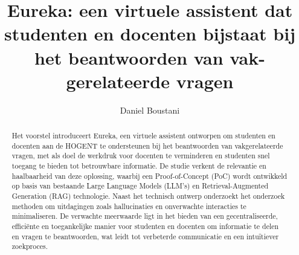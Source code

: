 \documentclass{hogent-article}
\title{Eureka: een virtuele assistent dat studenten en docenten bijstaat bij het beantwoorden van vak-gerelateerde vragen}
\author{Daniel Boustani}
\begin{document}
\begin{abstract}
  Het voorstel introduceert Eureka, een virtuele assistent ontworpen om studenten en docenten aan de HOGENT te ondersteunen bij het beantwoorden van vakgerelateerde vragen, met als doel de werkdruk voor docenten te verminderen en studenten snel toegang te bieden tot betrouwbare informatie. De studie verkent de relevantie en haalbaarheid van deze oplossing, waarbij een Proof-of-Concept (PoC) wordt ontwikkeld op basis van bestaande Large Language Models (LLM's) en Retrieval-Augmented Generation (RAG) technologie. Naast het technisch ontwerp onderzoekt het onderzoek methoden om uitdagingen zoals hallucinaties en onverwachte interacties te minimaliseren. De verwachte meerwaarde ligt in het bieden van een gecentraliseerde, efficiënte en toegankelijke manier voor studenten en docenten om informatie te delen en vragen te beantwoorden, wat leidt tot verbeterde communicatie en een intuïtiever zoekproces.
\end{abstract}

\tableofcontents



\printbibliography[heading=bibintoc]
\end{document}
